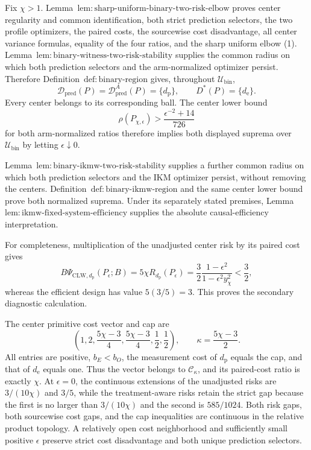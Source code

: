 Fix \(\chi>1\).  Lemma~\(\mathrm{lem{:}sharp\text{-}uniform\text{-}binary\text{-}two\text{-}risk\text{-}elbow}\) proves center regularity and common identification, both strict prediction selectors, the two profile optimizers, the paired costs, the sourcewise cost disadvantage, all center variance formulas, equality of the four ratios, and the sharp uniform elbow (1).  Lemma~\(\mathrm{lem{:}binary\text{-}witness\text{-}two\text{-}risk\text{-}stability}\) supplies the common radius on which both prediction selectors and the arm-normalized optimizer persist.  Therefore Definition~\(\mathrm{def{:}binary\text{-}region}\) gives, throughout \(\mathcal U_{\mathrm{bin}}\),
\[
 \mathcal D_{\mathrm{pred}}(P)=\mathcal D_{\mathrm{pred}}^A(P)=\{d_{\mathrm p}\},
 \qquad D^*(P)=\{d_{\mathrm e}\}.
\]
Every center belongs to its corresponding ball.  The center lower bound
\[
 \rho(P_{\chi,\epsilon})>\frac{\epsilon^{-2}+14}{726}
\]
for both arm-normalized ratios therefore implies both displayed suprema over \(\mathcal U_{\mathrm{bin}}\) by letting \(\epsilon\downarrow0\).

Lemma~\(\mathrm{lem{:}binary\text{-}ikmw\text{-}two\text{-}risk\text{-}stability}\) supplies a further common radius on which both prediction selectors and the IKM optimizer persist, without removing the centers.  Definition~\(\mathrm{def{:}binary\text{-}ikmw\text{-}region}\) and the same center lower bound prove both normalized suprema.  Under its separately stated premises, Lemma~\(\mathrm{lem{:}ikmw\text{-}fixed\text{-}system\text{-}efficiency}\) supplies the absolute causal-efficiency interpretation.

For completeness, multiplication of the unadjusted center risk by its paired cost gives
\[
 B\Psi_{\mathrm{CLW},d_{\mathrm p}}(P_\epsilon;B)
 =5\chi R_{d_{\mathrm p}}(P_\epsilon)
 =\frac32\frac{1-\epsilon^2}{1-\epsilon^2y_\chi^2}<\frac32,
\]
whereas the efficient design has value \(5(3/5)=3\).  This proves the secondary diagnostic calculation.

The center primitive cost vector and cap are
\[
 \left(1,2,\frac{5\chi-3}{4},\frac{5\chi-3}{4},\frac12,\frac12\right),
 \qquad \kappa=\frac{5\chi-3}{2}.
\]
All entries are positive, \(b_E<b_O\), the measurement cost of \(d_{\mathrm p}\) equals the cap, and that of \(d_{\mathrm e}\) equals one.  Thus the vector belongs to \(\mathcal C_\kappa\), and its paired-cost ratio is exactly \(\chi\).  At \(\epsilon=0\), the continuous extensions of the unadjusted risks are \(3/(10\chi)\) and \(3/5\), while the treatment-aware risks retain the strict gap because the first is no larger than \(3/(10\chi)\) and the second is \(585/1024\).  Both risk gaps, both sourcewise cost gaps, and the cap inequalities are continuous in the relative product topology.  A relatively open cost neighborhood and sufficiently small positive \(\epsilon\) preserve strict cost disadvantage and both unique prediction selectors.


